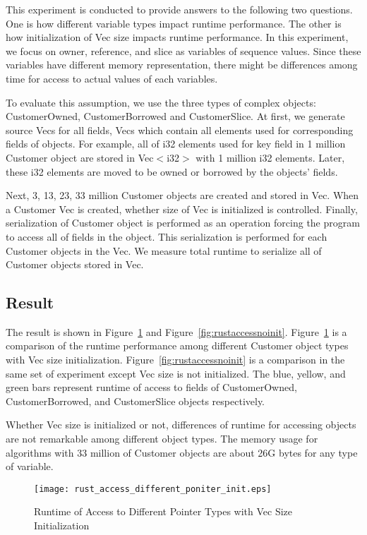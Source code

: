 This experiment is conducted to provide answers to the following two questions. One is how different variable types impact runtime performance.
The other is how initialization of Vec size impacts runtime performance. 
In this experiment, we focus on owner, reference, and slice as variables of sequence values. 
Since these variables have different memory representation, there might be differences among time for access to actual values of each variables.

To evaluate this assumption, we use the three types of complex objects: CustomerOwned, CustomerBorrowed and CustomerSlice. 
At first, we generate source Vecs for all fields, Vecs which contain all elements used for corresponding fields of objects.
For example, all of i32 elements used for key field in 1 million Customer object are stored in Vec$<$i32$>$ with 1 million i32 elements. 
Later, these i32 elements are moved to be owned or borrowed by the objects' fields.

Next, 3, 13, 23, 33 million Customer objects are created and stored in Vec. 
When a Customer Vec is created, whether size of Vec is initialized is controlled. 
Finally, serialization of Customer object is performed as an operation forcing the program to access all of fields in the object.
This serialization is performed for each Customer objects in the Vec. We measure total runtime to serialize all of Customer objects 
stored in Vec. 

\subsection{Result}
\label{sec:history}
The result is shown in Figure~\ref{fig:rustaccessinit} and Figure~\ref{fig:rustaccessnoinit}.
Figure~\ref{fig:rustaccessinit} is a comparison of the runtime performance among different Customer object types with Vec size initialization.
Figure~\ref{fig:rustaccessnoinit} is a comparison in the same set of experiment except Vec size is not initialized. 
The blue, yellow, and green bars represent runtime of access to fields of CustomerOwned, CustomerBorrowed, and CustomerSlice objects respectively.

Whether Vec size is initialized or not, differences of runtime for accessing objects are not remarkable among different object types. 
The memory usage for algorithms with 33 million of Customer objects are about 26G bytes for any type of variable.

\begin{figure}[htb]
    \texttt{[image: rust\_access\_different\_poniter\_init.eps]}
    \caption{Runtime of Access to Different Pointer Types with Vec Size Initialization}
    \label{fig:rustaccessinit}
\end{figure}

